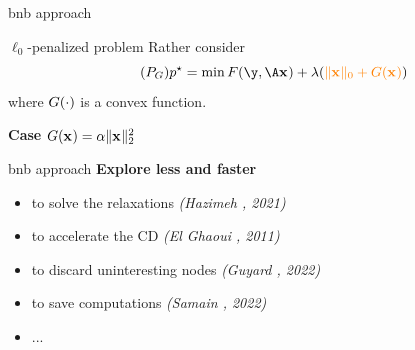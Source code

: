 \documentclass[10pt]{beamer}
\begin{document}
\begin{frame}{\gls{bnb} approach}
  \begin{center}
    \begin{minipage}{0.7\linewidth}
      \begin{block}{ $\ell_0$-penalized problem}
        Rather consider
        \begin{equation}
          \label{prob:prob-pertrbated} 
          \tag{\(\ppb_{\pertfunc}\)}
          \optobj = \min \datafunc(\obs,\dic\pv) + \reg (\emphone{\norm{\pv}{0} + \pertfunc(\pv)})
        \end{equation}
        where $G(\cdot)$ is a convex function.
      \end{block}
    \end{minipage}
  \end{center}
  \vspace*{1cm}
  \hfill
  \begin{minipage}[t]{0.49\linewidth}
    \textbf{Case $\pertfunc(\pv)= \alpha\norm{\pv}{2}^2$} 
    \pause
    
  \end{minipage}
\end{frame}

\begin{frame}{\gls{bnb} approach}
  \textbf{Explore less and faster}
  \pause
  \begin{itemize}
    \item {} to solve the relaxations \emph{(Hazimeh \etal, 2021)}
    \pause
    \item {} to accelerate the CD \emph{(El Ghaoui \etal, 2011)}
    \pause
    \item {} to discard uninteresting nodes \emph{(Guyard \etal, 2022)}
    \pause
    \item {} to save computations \emph{(Samain \etal, 2022)}
    \pause
    \item ...
  \end{itemize}
\end{frame}
\end{document}
